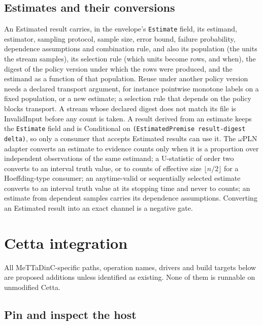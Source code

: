 \documentclass[11pt]{article}
\newcommand{\code}[1]{\texttt{#1}}
\begin{document}
\subsection{Estimates and their conversions}\label{sec:estimates}

An Estimated result carries, in the envelope's \code{Estimate} field, its estimand, estimator,
sampling protocol, sample size, error bound, failure probability, dependence assumptions and
combination rule, and also its population (the units
the stream samples), its selection rule (which units become rows, and when), the digest of the
policy version under which the rows were produced, and the estimand as a function of that
population. Reuse under another policy version needs a declared transport argument, for instance
pointwise monotone labels on a fixed population, or a new estimate; a selection rule that depends on
the policy blocks transport. A stream whose declared digest does not match its file is InvalidInput
before any count is taken. A result derived from an estimate keeps the \code{Estimate} field and is
Conditional on \code{(EstimatedPremise result-digest delta)}, so only a consumer that accepts
Estimated results can use it. The $\omega$PLN adapter converts an
estimate to evidence counts only when it is a proportion over independent observations of the same
estimand; a U-statistic of order two converts to an interval truth value, or to counts of effective
size $\lfloor n/2\rfloor$ for a Hoeffding-type consumer; an anytime-valid or sequentially selected
estimate converts to an interval truth value at its stopping time and never to counts; an estimate from
dependent samples carries its dependence assumptions. Converting an Estimated result into an exact
channel is a negative gate.

\section{Cetta integration}\label{sec:cetta}

All MeTTaDinC-specific paths, operation names, drivers and build targets below are proposed additions
unless identified as existing. None of them is runnable on unmodified Cetta.

\subsection{Pin and inspect the host}
\end{document}

